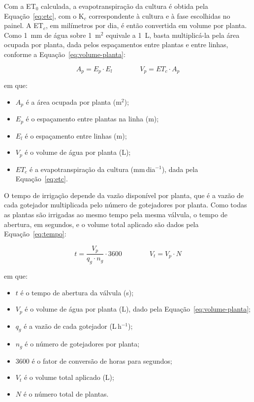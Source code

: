 Com a ET$_0$ calculada, a evapotranspiração da cultura é obtida pela Equação~\ref{eq:etc}, com o K$_c$ correspondente à cultura e à fase escolhidas no painel. A ET$_c$, em milímetros por dia, é então convertida em volume por planta. Como 1~mm de água sobre 1~m$^2$ equivale a 1~L, basta multiplicá-la pela área ocupada por planta, dada pelos espaçamentos entre plantas e entre linhas, conforme a Equação~\ref{eq:volume-planta}:

\begin{equation}
  A_p = E_p \cdot E_l
  \qquad\qquad
  V_p = ET_c \cdot A_p
  \label{eq:volume-planta}
\end{equation}

\noindent em que:
\begin{itemize}
  \item $A_p$ é a área ocupada por planta (m$^2$);
  \item $E_p$ é o espaçamento entre plantas na linha (m);
  \item $E_l$ é o espaçamento entre linhas (m);
  \item $V_p$ é o volume de água por planta (L);
  \item $ET_c$ é a evapotranspiração da cultura (mm\,dia$^{-1}$), dada pela Equação~\ref{eq:etc}.
\end{itemize}

O tempo de irrigação depende da vazão disponível por planta, que é a vazão de cada gotejador multiplicada pelo número de gotejadores por planta. Como todas as plantas são irrigadas ao mesmo tempo pela mesma válvula, o tempo de abertura, em segundos, e o volume total aplicado são dados pela Equação~\ref{eq:tempo}:

\begin{equation}
  t = \frac{V_p}{q_g \cdot n_g} \cdot 3600
  \qquad\qquad
  V_t = V_p \cdot N
  \label{eq:tempo}
\end{equation}

\noindent em que:
\begin{itemize}
  \item $t$ é o tempo de abertura da válvula (s);
  \item $V_p$ é o volume de água por planta (L), dado pela Equação~\ref{eq:volume-planta};
  \item $q_g$ é a vazão de cada gotejador (L\,h$^{-1}$);
  \item $n_g$ é o número de gotejadores por planta;
  \item 3600 é o fator de conversão de horas para segundos;
  \item $V_t$ é o volume total aplicado (L);
  \item $N$ é o número total de plantas.
\end{itemize}

